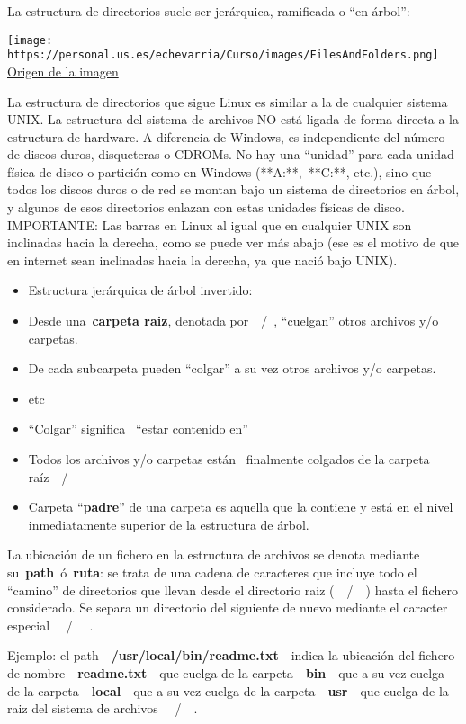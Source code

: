 \documentclass[
  letterpaper,
]{article}
\begin{document}
La estructura de directorios suele ser jerárquica, ramificada o ``en
árbol'':

\texttt{[image: https://personal.us.es/echevarria/Curso/images/FilesAndFolders.png]}\\
\href{http://es.wikipedia.org/wiki/Archivo:FilesAndFolders.png}{Origen
de la imagen}

La estructura de directorios que sigue Linux es similar a la de
cualquier sistema UNIX. La estructura del sistema de archivos NO está
ligada de forma directa a la estructura de hardware. A diferencia de
Windows, es independiente del número de discos duros, disqueteras o
CDROMs. No hay una ``unidad'' para cada unidad física de disco o
partición como en Windows (**A:**,~**C:**, etc.), sino que todos los
discos duros o de red se montan bajo un sistema de directorios en árbol,
y algunos de esos directorios enlazan con estas unidades físicas de
disco. IMPORTANTE: Las barras en Linux al igual que en cualquier UNIX
son inclinadas hacia la derecha, como se puede ver más abajo (ese es el
motivo de que en internet sean inclinadas hacia la derecha, ya que nació
bajo UNIX).

\begin{itemize}
\item
  Estructura jerárquica de árbol invertido:
\item
  Desde una~\textbf{carpeta raiz}, denotada por~~/~, ``cuelgan'' otros
  archivos y/o carpetas.
\item
  De cada subcarpeta pueden ``colgar'' a su vez otros archivos y/o
  carpetas.
\item
  etc
\item
  ``Colgar'' significa~ ``estar contenido en''
\item
  Todos los archivos y/o carpetas están~ finalmente colgados de la
  carpeta raíz~~/
\item
  Carpeta ``\textbf{padre}'' de una carpeta es aquella que la contiene y
  está en el nivel inmediatamente superior de la estructura de árbol.
\end{itemize}

La ubicación de un fichero en la estructura de archivos se denota
mediante su~\textbf{path}~ó~\textbf{ruta}: se trata de una cadena de
caracteres que incluye todo el ``camino'' de directorios que llevan
desde el directorio raiz (~~/~~) hasta el fichero considerado. Se separa
un directorio del siguiente de nuevo mediante el caracter especial ~~/~~
.

Ejemplo: el path~~\textbf{/usr/local/bin/readme.txt}~~indica la
ubicación del fichero de nombre~~\textbf{readme.txt}~~que cuelga de la
carpeta~~\textbf{bin}~~que a su vez cuelga de la
carpeta~~\textbf{local}~~que a su vez cuelga de la
carpeta~~\textbf{usr}~~que cuelga de la raiz del sistema de archivos
~~/~~.
\end{document}
